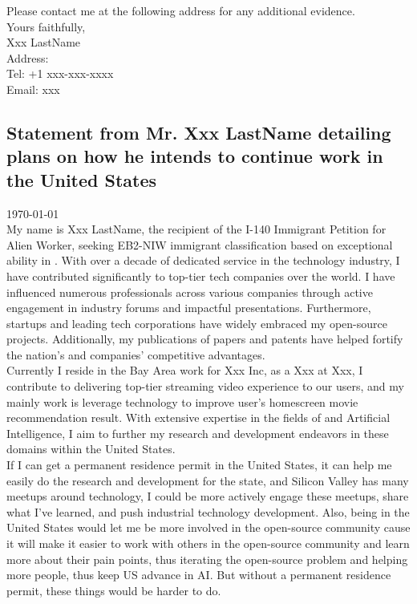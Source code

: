 \documentclass[11pt]{article}
\begin{document}
Please contact me at the following address for any additional evidence.\\

Yours faithfully, \\


\vspace{4em}
Xxx LastName\\

Address: \\
Tel: +1 xxx-xxx-xxxx\\
Email: xxx\\



\newpage



\subsection*{Statement from Mr. Xxx LastName detailing plans on how he intends to continue work in the United States}

\today\\


My name is Xxx LastName, the recipient of the I-140 Immigrant Petition for Alien Worker, seeking EB2-NIW immigrant classification based on exceptional ability in \fie{}. With over a decade of dedicated service in the technology industry, I have contributed significantly to top-tier tech companies over the world. I have influenced numerous professionals across various companies through active engagement in industry forums and impactful presentations. Furthermore, startups and leading tech corporations have widely embraced my open-source projects. Additionally, my publications of papers and patents have helped fortify the nation's and companies' competitive advantages. \\


Currently I reside in the Bay Area work for Xxx Inc, as a Xxx at Xxx, I contribute to delivering top-tier streaming video experience to our users, and my mainly work is leverage \fie{} technology to improve user's homescreen movie recommendation result. With extensive expertise in the fields of \fie{} and Artificial Intelligence, I aim to further my research and development endeavors in these domains within the United States. \\


If I can get a permanent residence permit in the United States, it can help me easily do the research and development for the state, and Silicon Valley has many meetups around technology, I could be more actively engage these meetups, share what I've learned, and push industrial technology development. Also, being in the United States would let me be more involved in the open-source community cause it will make it easier to work with others in the open-source community and learn more about their pain points, thus iterating the open-source problem and helping more people, thus keep US advance in AI. But without a permanent residence permit, these things would be harder to do. \\ 
\end{document}
